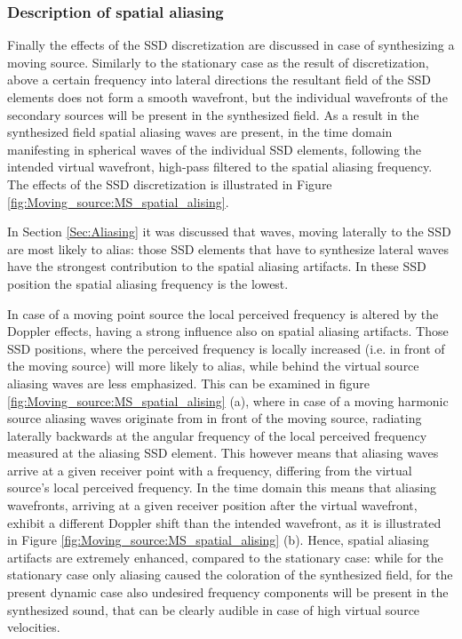 \subsubsection{Description of spatial aliasing}
Finally the effects of the SSD discretization are discussed in case of synthesizing a moving source.
Similarly to the stationary case as the result of discretization, above a certain frequency into lateral directions the resultant field of the SSD elements does not form a smooth wavefront, but the individual wavefronts of the secondary sources will be present in the synthesized field.
As a result in the synthesized field spatial aliasing waves are present, in the time domain manifesting in spherical waves of the individual SSD elements, following the intended virtual wavefront, high-pass filtered to the spatial aliasing frequency.
The effects of the SSD discretization is illustrated in Figure \ref{fig:Moving_source:MS_spatial_alising}.

In Section \ref{Sec:Aliasing} it was discussed that waves, moving laterally to the SSD are most likely to alias: those SSD elements that have to synthesize lateral waves have the strongest contribution to the spatial aliasing artifacts.
In these SSD position the spatial aliasing frequency is the lowest.

In case of a moving point source the local perceived frequency is altered by the Doppler effects, having a strong influence also on spatial aliasing artifacts.
Those SSD positions, where the perceived frequency is locally increased (i.e. in front of the moving source) will more likely to alias, while behind the virtual source aliasing waves are less emphasized.
This can be examined in figure \ref{fig:Moving_source:MS_spatial_alising} (a), where in case of a moving harmonic source aliasing waves originate from in front of the moving source, radiating laterally backwards at the angular frequency of the local perceived frequency measured at the aliasing SSD element.
This however means that aliasing waves arrive at a given receiver point with a frequency, differing from the virtual source's local perceived frequency.
In the time domain this means that aliasing wavefronts, arriving at a given receiver position after the virtual wavefront, exhibit a different Doppler shift than the intended wavefront, as it is illustrated in Figure \ref{fig:Moving_source:MS_spatial_alising} (b).
Hence, spatial aliasing artifacts are extremely enhanced, compared to the stationary case: while for the stationary case only aliasing caused the coloration of the synthesized field, for the present dynamic case also undesired frequency components will be present in the synthesized sound, that can be clearly audible in case of high virtual source velocities.

